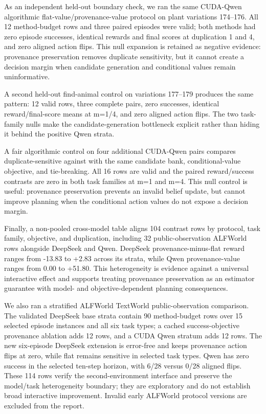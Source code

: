 \documentclass[10pt]{article}
\begin{document}
As an independent held-out boundary check, we ran the same CUDA-Qwen algorithmic flat-value/provenance-value protocol on plant variations 174--176. All 12 method-budget rows and three paired episodes were valid; both methods had zero episode successes, identical rewards and final scores at duplication 1 and 4, and zero aligned action flips. This null expansion is retained as negative evidence: provenance preservation removes duplicate sensitivity, but it cannot create a decision margin when candidate generation and conditional values remain uninformative.

A second held-out find-animal control on variations 177--179 produces the same pattern: 12 valid rows, three complete pairs, zero successes, identical reward/final-score means at m=1/4, and zero aligned action flips. The two task-family nulls make the candidate-generation bottleneck explicit rather than hiding it behind the positive Qwen strata.

A fair algorithmic control on four additional CUDA-Qwen pairs compares duplicate-sensitive \texttt{} against \texttt{} with the same candidate bank, conditional-value objective, and tie-breaking. All 16 rows are valid and the paired reward/success contrasts are zero in both task families at m=1 and m=4. This null control is useful: provenance preservation prevents an invalid belief update, but cannot improve planning when the conditional action values do not expose a decision margin.

Finally, a non-pooled cross-model table aligns 104 contrast rows by protocol, task family, objective, and duplication, including 32 public-observation ALFWorld rows alongside DeepSeek and Qwen. DeepSeek provenance-minus-flat reward ranges from -13.83 to +2.83 across its strata, while Qwen provenance-value ranges from 0.00 to +51.80. This heterogeneity is evidence against a universal interactive effect and supports treating provenance preservation as an estimator guarantee with model- and objective-dependent planning consequences.

We also ran a stratified ALFWorld TextWorld public-observation comparison. The validated DeepSeek base strata contain 90 method-budget rows over 15 selected episode instances and all six task types; a cached success-objective provenance ablation adds 12 rows, and a CUDA Qwen stratum adds 12 rows. The new six-episode DeepSeek extension is error-free and keeps provenance action flips at zero, while flat remains sensitive in selected task types. Qwen has zero success in the selected ten-step horizon, with 6/28 versus 0/28 aligned flips. These 114 rows verify the second-environment interface and preserve the model/task heterogeneity boundary; they are exploratory and do not establish broad interactive improvement. Invalid early ALFWorld protocol versions are excluded from the report.
\end{document}
